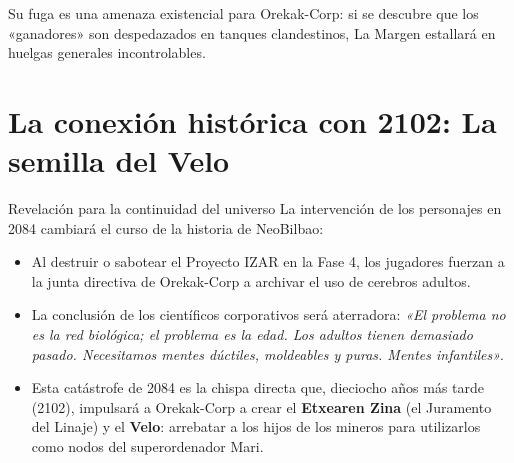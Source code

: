 Su fuga es una amenaza existencial para Orekak-Corp: si se descubre que los «ganadores» son despedazados en tanques clandestinos, La Margen estallará en huelgas generales incontrolables.

\section{La conexión histórica con 2102: La semilla del Velo}

\begin{CajaRegla}{Revelación para la continuidad del universo}
La intervención de los personajes en 2084 cambiará el curso de la historia de NeoBilbao:
\begin{itemize}
  \item Al destruir o sabotear el Proyecto IZAR en la Fase 4, los jugadores fuerzan a la junta directiva de Orekak-Corp a archivar el uso de cerebros adultos.
  \item La conclusión de los científicos corporativos será aterradora: \emph{«El problema no es la red biológica; el problema es la edad. Los adultos tienen demasiado pasado. Necesitamos mentes dúctiles, moldeables y puras. Mentes infantiles»}.
  \item Esta catástrofe de 2084 es la chispa directa que, dieciocho años más tarde (2102), impulsará a Orekak-Corp a crear el \textbf{Etxearen Zina} (el Juramento del Linaje) y el \textbf{Velo}: arrebatar a los hijos de los mineros para utilizarlos como nodos del superordenador Mari.
\end{itemize}
\end{CajaRegla}

